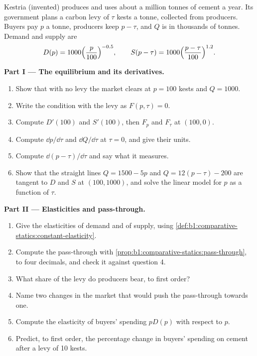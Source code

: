 \begin{problem}\label{pb:b1:comparative-statics:cement}
Kestria (invented) produces and uses about a million tonnes of cement a
year. Its government plans a carbon levy of $\tau$ kests a tonne, collected
from producers. Buyers pay $p$ a tonne, producers keep $p - \tau$, and $Q$ is in
thousands of tonnes. Demand and supply are
\[
D(p) = 1000\Bigl(\frac{p}{100}\Bigr)^{-0.5}, \qquad
S(p - \tau) = 1000\Bigl(\frac{p - \tau}{100}\Bigr)^{1.2}.
\]

\medskip\noindent\textbf{Part I --- The equilibrium and its derivatives.}
\begin{enumerate}
  \item Show that with no levy the market clears at $p = 100$ kests and $Q = 1000$.
  \item Write the  condition with the levy as $F(p, \tau) = 0$.
  \item Compute $D'(100)$ and $S'(100)$, then $F_p$ and $F_\tau$ at $(100, 0)$.
  \item Compute $\dd p/\dd\tau$ and $\dd Q/\dd\tau$ at $\tau = 0$, and give their units.
  \item Compute $\dd(p - \tau)/\dd\tau$ and say what it measures.
  \item Show that the straight lines $Q = 1500 - 5p$ and $Q = 12(p - \tau) - 200$ are tangent to $D$ and $S$ at $(100, 1000)$, and solve the linear model for $p$ as a function of $\tau$.
\end{enumerate}

\medskip\noindent\textbf{Part II --- Elasticities and pass-through.}
\begin{enumerate}[resume]
  \item Give the elasticities of demand and of supply, using \cref{def:b1:comparative-statics:constant-elasticity}.
  \item Compute the pass-through with \cref{prop:b1:comparative-statics:pass-through}, to four decimals, and check it against question 4.
  \item What share of the levy do producers bear, to first order?
  \item Name two changes in the market that would push the pass-through towards one.
  \item Compute the elasticity of buyers' spending $pD(p)$ with respect to $p$.
  \item Predict, to first order, the percentage change in buyers' spending on cement after a levy of 10 kests.
\end{enumerate}


\end{problem}
